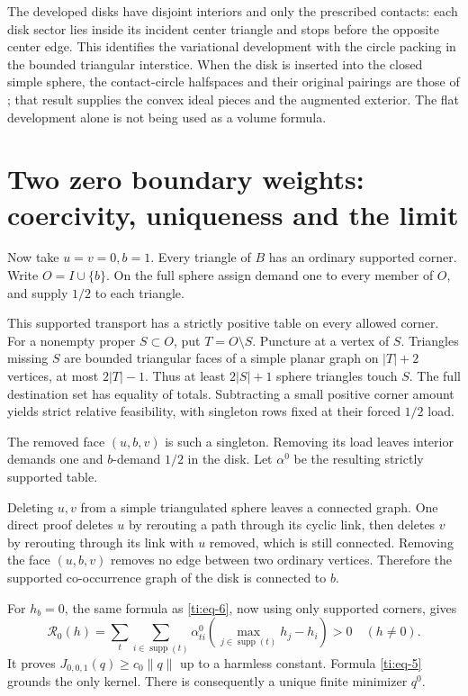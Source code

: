 \documentclass[11pt]{article}
\numberwithin{equation}{section}
\theoremstyle{definition}\newtheorem{definition}[theorem]{Definition}
\theoremstyle{remark}\newtheorem{remark}[theorem]{Remark}
\begin{document}
The developed disks have disjoint interiors and only the prescribed contacts: each disk sector lies inside its incident center triangle and stops before the opposite center edge. This identifies the variational development with the circle packing
in the bounded triangular interstice. When the disk is inserted into
the closed simple sphere, the contact-circle halfspaces and their
original pairings are those of \cite[Proposition 2.1]{Marked}; that
result supplies the convex ideal pieces and the augmented exterior.
The flat development alone is not being used as a volume formula.

\section{Two zero boundary weights: coercivity, uniqueness and the limit}\label{ti:sec-4}

Now take \(u=v=0,b=1\). Every triangle of \(B\) has an ordinary supported corner. Write \(O=I\cup\{b\}\). On the full sphere assign demand one to every member of \(O\), and supply \(1/2\) to each triangle.

This supported transport has a strictly positive table on every allowed corner. For a nonempty proper \(S\subset O\), put \(T=O\setminus S\). Puncture at a vertex of \(S\). Triangles missing \(S\) are bounded triangular faces of a simple planar graph on \(|T|+2\) vertices, at most \(2|T|-1\). Thus at least \(2|S|+1\) sphere triangles touch \(S\). The full destination set has equality of totals. Subtracting a small positive corner amount yields strict relative feasibility, with singleton rows fixed at their forced \(1/2\) load.

The removed face \((u,b,v)\) is such a singleton. Removing its load leaves interior demands one and \(b\)-demand \(1/2\) in the disk. Let \(\alpha^0\) be the resulting strictly supported table.

Deleting \(u,v\) from a simple triangulated sphere leaves a connected graph. One direct proof deletes \(u\) by rerouting a path through its cyclic link, then deletes \(v\) by rerouting through its link with \(u\) removed, which is still connected. Removing the face \((u,b,v)\) removes no edge between two ordinary vertices. Therefore the supported co-occurrence graph of the disk is connected to \(b\).

For \(h_b=0\), the same formula as \eqref{ti:eq-6}, now using only supported corners, gives
\begin{equation}\label{ti:eq-9}
\mathcal R_0(h)=
\sum_t\sum_{i\in\operatorname{supp}(t)}
\alpha^0_{ti}\left(\max_{j\in\operatorname{supp}(t)}h_j-h_i\right)>0
\quad(h\ne0).
\end{equation}
It proves \(J_{0,0,1}(q)\ge c_0\lVert q\rVert\) up to a harmless constant. Formula \eqref{ti:eq-5} grounds the only kernel. There is consequently a unique finite minimizer \(q^0\).
\end{document}
